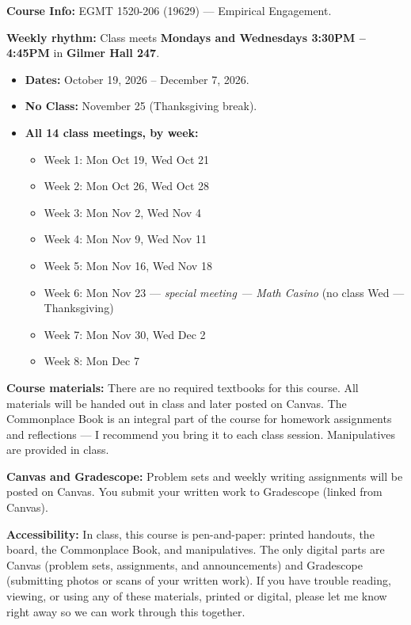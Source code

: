 \documentclass[oneside,11pt]{amsart}
\begin{document}
\smallskip
\noindent\textbf{Course Info:} EGMT 1520-206 (19629) --- Empirical Engagement.

\smallskip
\noindent\textbf{Weekly rhythm:} Class meets \textbf{Mondays and Wednesdays 3:30PM -- 4:45PM} in \textbf{Gilmer Hall 247}.
\begin{itemize}
    \item \textbf{Dates:} October 19, 2026 -- December 7, 2026.
    \item \textbf{No Class:} November 25 (Thanksgiving break).
    \item \textbf{All 14 class meetings, by week:}
    \begin{itemize}
        \item Week 1: Mon Oct 19, Wed Oct 21
        \item Week 2: Mon Oct 26, Wed Oct 28
        \item Week 3: Mon Nov 2, Wed Nov 4
        \item Week 4: Mon Nov 9, Wed Nov 11
        \item Week 5: Mon Nov 16, Wed Nov 18
        \item Week 6: Mon Nov 23 --- \emph{special meeting --- Math Casino} (no class Wed --- Thanksgiving)
        \item Week 7: Mon Nov 30, Wed Dec 2
        \item Week 8: Mon Dec 7
    \end{itemize}
\end{itemize}

\smallskip
\noindent
\textbf{Course materials:}
There are no required textbooks for this course.
All materials will be handed out in class and later posted on Canvas.
The Commonplace Book is an integral part of the course for homework assignments and reflections --- I recommend you bring it to
each class session.
Manipulatives are provided in class.

\smallskip
\noindent
\textbf{Canvas and Gradescope:} Problem sets and weekly writing assignments will be posted on Canvas. You submit your written work to Gradescope (linked from Canvas).

\smallskip
\noindent
\textbf{Accessibility:} In class, this course is pen-and-paper: printed handouts, the board, the Commonplace Book, and manipulatives. The only digital parts are Canvas (problem sets, assignments, and announcements) and Gradescope (submitting photos or scans of your written work). If you have trouble reading, viewing, or using any of these materials, printed or digital, please let me know right away so we can work through this together.
\end{document}
